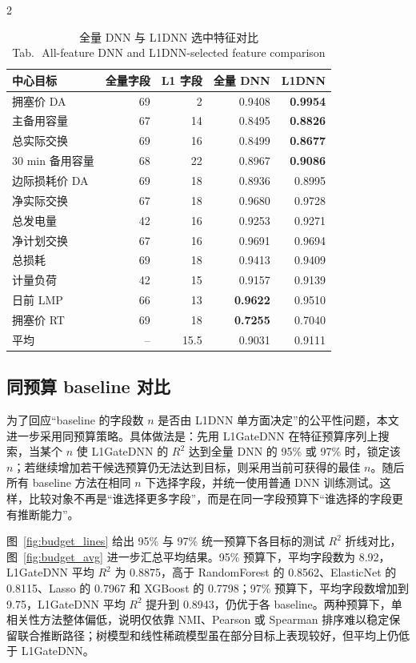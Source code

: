 \documentclass[UTF8,zihao=5,twoside]{ctexart}
\numberwithin{equation}{section}
\newcommand{\tabbicaption}[2]{%
  \caption{#1\\[-0.2em]\small Tab.\,\thetable\ #2}
}
\begin{document}
\begin{multicols}{2}
\begin{table}[H]
\centering
\scriptsize
\setlength{\tabcolsep}{2pt}
\tabbicaption{全量 DNN 与 L1DNN 选中特征对比}{All-feature DNN and L1DNN-selected feature comparison}
\label{tab:dnn_l1_compare}
\begin{tabularx}{\columnwidth}{Xrrrr}
\toprule
中心目标 & 全量字段 & L1 字段 & 全量 DNN & L1DNN \\
\midrule
拥塞价 DA & 69 & 2 & 0.9408 & \textbf{0.9954} \\
主备用容量 & 67 & 14 & 0.8495 & \textbf{0.8826} \\
总实际交换 & 69 & 16 & 0.8499 & \textbf{0.8677} \\
30 min 备用容量 & 68 & 22 & 0.8967 & \textbf{0.9086} \\
边际损耗价 DA & 69 & 18 & 0.8936 & 0.8995 \\
净实际交换 & 67 & 18 & 0.9680 & 0.9728 \\
总发电量 & 42 & 16 & 0.9253 & 0.9271 \\
净计划交换 & 67 & 16 & 0.9691 & 0.9694 \\
总损耗 & 69 & 18 & 0.9413 & 0.9409 \\
计量负荷 & 42 & 15 & 0.9157 & 0.9139 \\
日前 LMP & 66 & 13 & \textbf{0.9622} & 0.9510 \\
拥塞价 RT & 69 & 18 & \textbf{0.7255} & 0.7040 \\
\midrule
平均 & -- & 15.5 & 0.9031 & 0.9111 \\
\bottomrule
\end{tabularx}
\end{table}

\subsection{同预算 baseline 对比}
为了回应“baseline 的字段数 $n$ 是否由 L1DNN 单方面决定”的公平性问题，本文进一步采用同预算策略。具体做法是：先用 L1GateDNN 在特征预算序列上搜索，当某个 $n$ 使 L1GateDNN 的 $R^2$ 达到全量 DNN 的 95\% 或 97\% 时，锁定该 $n$；若继续增加若干候选预算仍无法达到目标，则采用当前可获得的最佳 $n$。随后所有 baseline 方法在相同 $n$ 下选择字段，并统一使用普通 DNN 训练测试。这样，比较对象不再是“谁选择更多字段”，而是在同一字段预算下“谁选择的字段更有推断能力”。

图~\ref{fig:budget_lines} 给出 95\% 与 97\% 统一预算下各目标的测试 $R^2$ 折线对比，图~\ref{fig:budget_avg} 进一步汇总平均结果。95\% 预算下，平均字段数为 8.92，L1GateDNN 平均 $R^2$ 为 0.8875，高于 RandomForest 的 0.8562、ElasticNet 的 0.8115、Lasso 的 0.7967 和 XGBoost 的 0.7798；97\% 预算下，平均字段数增加到 9.75，L1GateDNN 平均 $R^2$ 提升到 0.8943，仍优于各 baseline。两种预算下，单相关性方法整体偏低，说明仅依靠 NMI、Pearson 或 Spearman 排序难以稳定保留联合推断路径；树模型和线性稀疏模型虽在部分目标上表现较好，但平均上仍低于 L1GateDNN。


\end{multicols}
\end{document}
